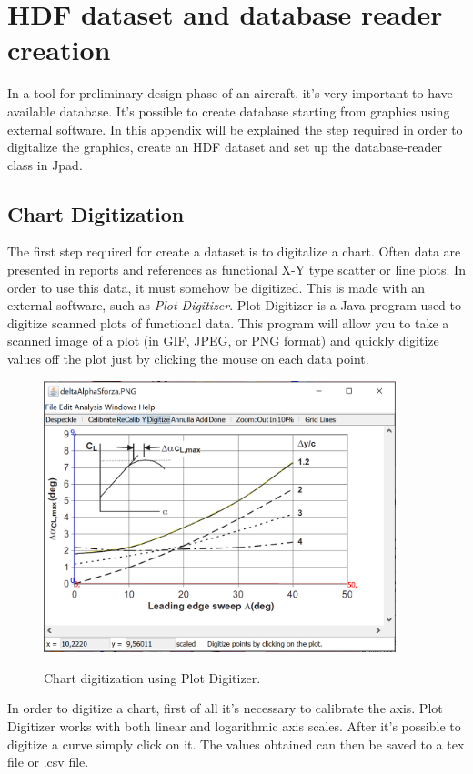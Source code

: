 
\chapter{HDF dataset and database reader creation}
\label{ch:hdigitalizer}
In a tool for preliminary design phase of an aircraft, it's very important to have available database. It's possible to create database starting from graphics using external software. In this appendix will be explained the step required in order to digitalize the graphics, create an HDF dataset and set up the database-reader class in Jpad.

\section{Chart Digitization}
The first step required for create a dataset is to digitalize a chart. Often data are presented in reports and references as functional X-Y type scatter or line plots. In order to use this data, it must somehow be digitized. This is made with an external software, such as {\itshape Plot Digitizer}. Plot Digitizer is a Java program used to digitize scanned plots of functional data. This program will allow you to take a scanned image of a plot (in GIF, JPEG, or PNG format) and quickly digitize values off the plot just by clicking the mouse on each data point.\cite{plotdigitizer}

\begin{figure}[H]
\centering
{\includegraphics[height=7.9cm]{Immagini/digitize.png}} 
\caption{Chart digitization using Plot Digitizer.}
\label{angles}
\end{figure} 


In order to digitize a chart, first of all it's necessary to calibrate the axis. Plot Digitizer works with both linear and logarithmic axis scales. After it's possible to digitize a curve simply click on it. The values obtained can then be saved to a tex file or .csv file.


